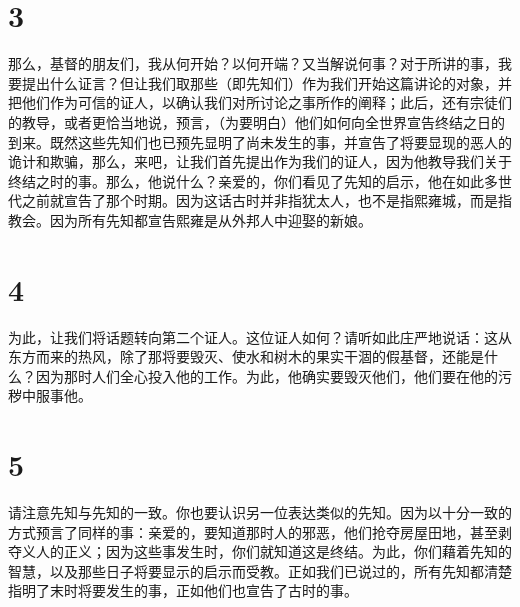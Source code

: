 
\section{3}

那么，基督的朋友们，我从何开始？以何开端？又当解说何事？对于所讲的事，我要提出什么证言？但让我们取那些（即先知们）作为我们开始这篇讲论的对象，并把他们作为可信的证人，以确认我们对所讨论之事所作的阐释；此后，还有宗徒们的教导，或者更恰当地说，预言，（为要明白）他们如何向全世界宣告终结之日的到来。既然这些先知们也已预先显明了尚未发生的事，并宣告了将要显现的恶人的诡计和欺骗，那么，来吧，让我们首先提出作为我们的证人，因为他教导我们关于终结之时的事。那么，他说什么？亲爱的，你们看见了先知的启示，他在如此多世代之前就宣告了那个时期。因为这话古时并非指犹太人，也不是指熙雍城，而是指教会。因为所有先知都宣告熙雍是从外邦人中迎娶的新娘。\par


\section{4}

为此，让我们将话题转向第二个证人。这位证人如何？请听如此庄严地说话：这从东方而来的热风，除了那将要毁灭、使水和树木的果实干涸的假基督，还能是什么？因为那时人们全心投入他的工作。为此，他确实要毁灭他们，他们要在他的污秽中服事他。\par


\section{5}

请注意先知与先知的一致。你也要认识另一位表达类似的先知。因为以十分一致的方式预言了同样的事：亲爱的，要知道那时人的邪恶，他们抢夺房屋田地，甚至剥夺义人的正义；因为这些事发生时，你们就知道这是终结。为此，你们藉着先知的智慧，以及那些日子将要显示的启示而受教。正如我们已说过的，所有先知都清楚指明了末时将要发生的事，正如他们也宣告了古时的事。\par

